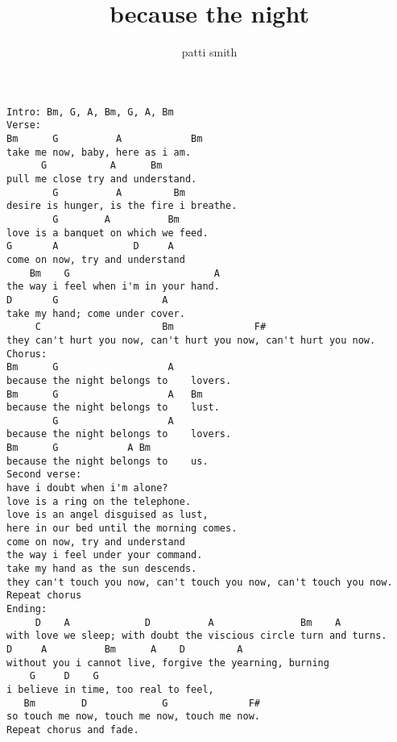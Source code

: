 \author{patti smith}
\title{because the night}
\maketitle
\begin{verbatim}
Intro: Bm, G, A, Bm, G, A, Bm
Verse:
Bm      G          A            Bm
take me now, baby, here as i am.
      G           A      Bm
pull me close try and understand.
        G          A         Bm
desire is hunger, is the fire i breathe.
        G        A          Bm
love is a banquet on which we feed.
G       A             D     A
come on now, try and understand
    Bm    G                         A
the way i feel when i'm in your hand.
D       G                  A
take my hand; come under cover.
     C                     Bm              F#
they can't hurt you now, can't hurt you now, can't hurt you now.
Chorus:
Bm      G                   A
because the night belongs to    lovers.
Bm      G                   A   Bm
because the night belongs to    lust.
        G                   A
because the night belongs to    lovers.
Bm      G            A Bm
because the night belongs to    us.
Second verse:
have i doubt when i'm alone?
love is a ring on the telephone.
love is an angel disguised as lust,
here in our bed until the morning comes.
come on now, try and understand
the way i feel under your command.
take my hand as the sun descends.
they can't touch you now, can't touch you now, can't touch you now.
Repeat chorus
Ending:
     D    A             D          A               Bm    A
with love we sleep; with doubt the viscious circle turn and turns.
D     A          Bm      A    D         A
without you i cannot live, forgive the yearning, burning
    G     D    G
i believe in time, too real to feel,
   Bm        D             G              F#
so touch me now, touch me now, touch me now.
Repeat chorus and fade.
\end{verbatim}